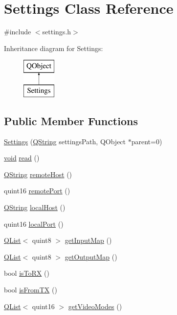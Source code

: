 \hypertarget{class_settings}{\section{Settings Class Reference}
\label{class_settings}
}


{\ttfamily \#include $<$settings.\-h$>$}

Inheritance diagram for Settings\-:\begin{figure}[H]
\begin{center}
\leavevmode
\includegraphics[height=2.000000cm]{class_settings}
\end{center}
\end{figure}
\subsection*{Public Member Functions}
\begin{DoxyCompactItemize}
\item 
\hyperlink{group___aero_sim_r_c_ga93af04323b9db4a809d0376a1ea6a7ae}{Settings} (\hyperlink{group___u_a_v_objects_plugin_gab9d252f49c333c94a72f97ce3105a32d}{Q\-String} settings\-Path, Q\-Object $\ast$parent=0)
\item 
\hyperlink{group___u_a_v_objects_plugin_ga444cf2ff3f0ecbe028adce838d373f5c}{void} \hyperlink{group___aero_sim_r_c_gac0f3ec889ab03b807e937580704a3ee9}{read} ()
\item 
\hyperlink{group___u_a_v_objects_plugin_gab9d252f49c333c94a72f97ce3105a32d}{Q\-String} \hyperlink{group___aero_sim_r_c_ga488c7f5a87b95d6b3e0b8d8c0647f984}{remote\-Host} ()
\item 
quint16 \hyperlink{group___aero_sim_r_c_gafd3c776de1db18a53414fc9ff7d5f656}{remote\-Port} ()
\item 
\hyperlink{group___u_a_v_objects_plugin_gab9d252f49c333c94a72f97ce3105a32d}{Q\-String} \hyperlink{group___aero_sim_r_c_gaf2ca84445d77cc2649ac0aa4958051f0}{local\-Host} ()
\item 
quint16 \hyperlink{group___aero_sim_r_c_gadb246f8a0f4976071e8e302b553df863}{local\-Port} ()
\item 
\hyperlink{class_q_list}{Q\-List}$<$ quint8 $>$ \hyperlink{group___aero_sim_r_c_ga6607c28a72f6470cd410ac7baf8fba49}{get\-Input\-Map} ()
\item 
\hyperlink{class_q_list}{Q\-List}$<$ quint8 $>$ \hyperlink{group___aero_sim_r_c_ga9c382b0fc01ca068ccf9f0226d707bc9}{get\-Output\-Map} ()
\item 
bool \hyperlink{group___aero_sim_r_c_ga80495f779a8152a0c16eed12fcfd69e4}{is\-To\-R\-X} ()
\item 
bool \hyperlink{group___aero_sim_r_c_gaa18f01bc8cd2c71856c0b13cc9fc3745}{is\-From\-T\-X} ()
\item 
\hyperlink{class_q_list}{Q\-List}$<$ quint16 $>$ \hyperlink{group___aero_sim_r_c_ga885d740d0bc91afd8207ef878147e0d7}{get\-Video\-Modes} ()
\end{DoxyCompactItemize}


